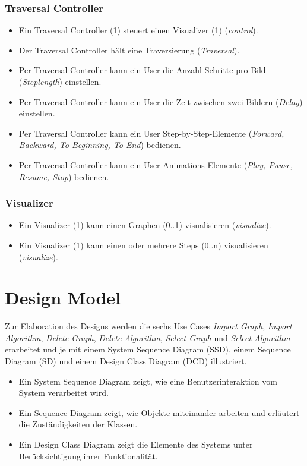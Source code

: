 \subsubsection{Traversal Controller}
\label{subsubsec:Traversal Controller}
\begin{itemize}
  \item Ein Traversal Controller (1) steuert einen Visualizer (1) (\textit{control}).
  \item Der Traversal Controller h\"alt eine Traversierung (\textit{Traversal}).
  \item Per Traversal Controller kann ein User die Anzahl Schritte pro Bild (\textit{Steplength}) einstellen.
  \item Per Traversal Controller kann ein User die Zeit zwischen zwei Bildern (\textit{Delay}) einstellen.
  \item Per Traversal Controller kann ein User Step-by-Step-Elemente (\textit{Forward, Backward, To Beginning, To End}) bedienen.
  \item Per Traversal Controller kann ein User Animations-Elemente (\textit{Play, Pause, Resume, Stop}) bedienen.
\end{itemize}

\subsubsection{Visualizer}
\label{subsubsec:Visualizer}
\begin{itemize}
  \item Ein Visualizer (1) kann einen Graphen (0..1) visualisieren (\textit{visualize}).
  \item Ein Visualizer (1) kann einen oder mehrere Steps (0..n) visualisieren (\textit{visualize}).
\end{itemize}
% 
\section{Design Model}
\label{sec:Design Model}
Zur Elaboration des Designs werden die sechs Use Cases \textit{Import Graph}, \textit{Import Algorithm}, \textit{Delete Graph}, \textit{Delete Algorithm}, \textit{Select Graph} und \textit{Select Algorithm} erarbeitet und je mit einem System Sequence Diagram (SSD), einem Sequence Diagram (SD) und einem Design Class Diagram (DCD) illustriert.
\begin{itemize}
  \item Ein System Sequence Diagram zeigt, wie eine Benutzerinteraktion vom System verarbeitet wird.
  \item Ein Sequence Diagram zeigt, wie Objekte miteinander arbeiten und erl\"autert die Zust\"andigkeiten der Klassen. 
  \item Ein Design Class Diagram zeigt die Elemente des Systems unter Ber\"ucksichtigung ihrer Funktionalit\"at.
\end{itemize}

